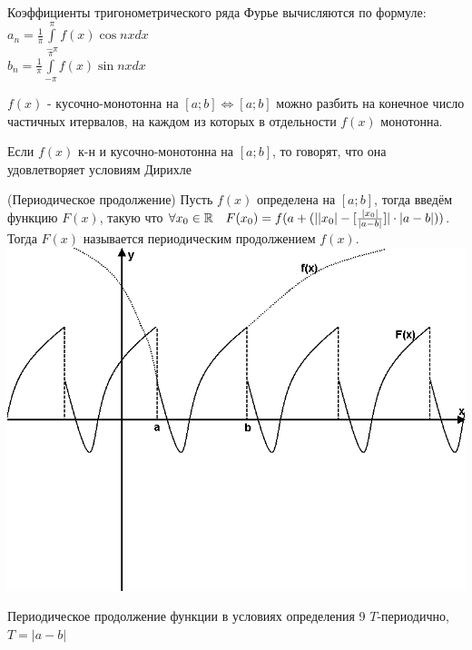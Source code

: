 \begin{Note}
	Коэффициенты тригонометрического ряда Фурье вычисляются по формуле:\\
	$a_n = \frac{1}{\pi}\int\limits_{-\pi}^{\pi}f(x)\cos nx dx$\\
	$b_n = \frac{1}{\pi}\int\limits_{-\pi}^{\pi}f(x)\sin nx dx$
\end{Note}

\begin{Def}
	$f(x)$ - кусочно-монотонна на $[a;b] \Leftrightarrow [a;b]$ можно разбить на конечное число частичных итервалов, на каждом из которых в отдельности $f(x)$ монотонна.
\end{Def}

\begin{Note}
	Если $f(x)$ к-н и кусочно-монотонна на $[a;b]$, то говорят, что она удовлетворяет условиям Дирихле
\end{Note}

\begin{Def}(Периодическое продолжение)
	Пусть $f(x)$ определена на $[a;b]$, тогда введём функцию $F(x)$, такую что $\forall x_0 \in \mathbb{R} \quad F(x_0) = f(a + (||x_0| - [\frac{|x_0|}{|a-b|}]| \cdot |a-b|))$. Тогда $F(x)$ называется периодическим продолжением $f(x)$.\\
	\includegraphics[width=1\textwidth]{pictures/5_2_1.png}
\end{Def}

\begin{Note}
	Периодическое продолжение функции в условиях определения 9 $T$-периодично, $T = |a-b|$
\end{Note}

